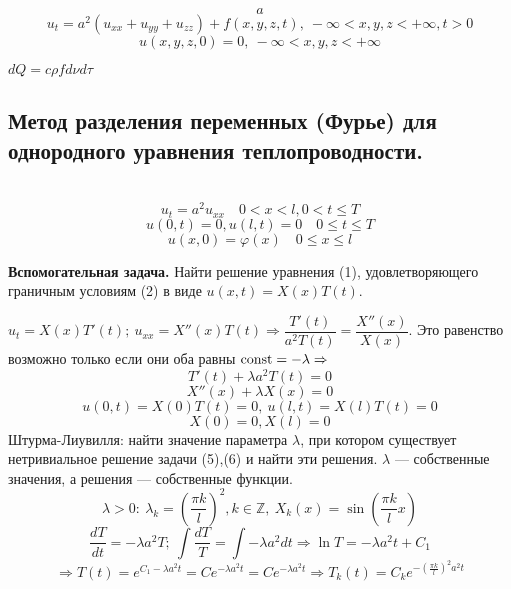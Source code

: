 \documentclass[9pt]{article}
\begin{document}
\begin{equation}
    a
\end{equation}
\begin{equation}
    u_t=a^2(u_{xx}+u_{yy}+u_{zz})+f(x,y,z,t),\ -\infty<x,y,z<+\infty,t>0
\end{equation}
\begin{equation}
    u(x,y,z,0)=0,\ -\infty<x,y,z<+\infty
\end{equation}
\par\(dQ=c\rho fd\nu d\tau\)

\subsection{Метод разделения переменных (Фурье) для однородного уравнения теплопроводности.}

\ 
\begin{equation}
    u_t=a^2u_{xx}\quad 0<x<l,0<t\le T
\end{equation}
\begin{equation}
    u(0,t)=0,u(l,t)=0\quad0\le t\le T
\end{equation}
\begin{equation}
    u(x,0)=\varphi(x)\quad 0\le x\le l
\end{equation}
\par\textbf{Вспомогательная задача.} Найти решение уравнения (1), удовлетворяющего граничным условиям (2) в виде \(u(x,t)=X(x)T(t)\).
\par\(u_t=X(x)T'(t);\ u_{xx}=X''(x)T(t)\Rightarrow\dfrac{T'(t)}{a^2T(t)}=\dfrac{X''(x)}{X(x)}\). Это равенство возможно только если они оба равны \(\operatorname{const}=-\lambda\Rightarrow\)
\begin{equation}
    T'(t)+\lambda a^2T(t)=0
\end{equation}
\begin{equation}
    X''(x)+\lambda X(x)=0
\end{equation}
\[u(0,t)=X(0)T(t)=0,\ u(l,t)=X(l)T(t)=0\]
\begin{equation}
    X(0)=0,X(l)=0
\end{equation}
 Штурма-Лиувилля: найти значение параметра \(\lambda\), при котором существует нетривиальное решение задачи (5),(6) и найти эти решения. \(\lambda\) --- собственные значения, а решения --- собственные функции.
\[\lambda>0:\ \lambda_k=(\dfrac{\pi k}{l})^2,k\in \mathbb Z,\ X_k(x)=\sin(\dfrac{\pi k}{l}x)\]
\[\dfrac{dT}{dt}=-\lambda a^2T;\ \int\dfrac{dT}{T}=\int-\lambda a^2dt\Rightarrow\ln T=-\lambda a^2t+C_1\]
\[\Rightarrow T(t)=e^{C_1-\lambda a^2t}=Ce^{-\lambda a^2t}=Ce^{-\lambda a^2t}\Rightarrow T_k(t)=C_ke^{-(\frac{\pi k}{l})^2a^2t}\]
\end{document}
